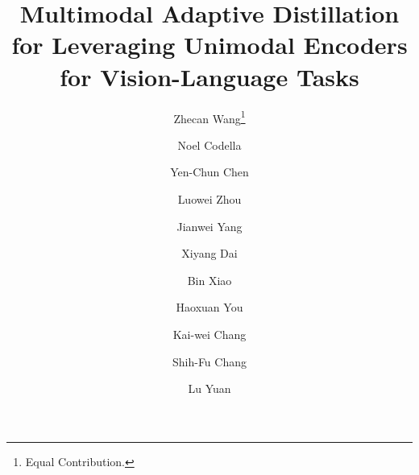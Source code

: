 \documentclass[runningheads]{llncs}
\begin{document}
\pagestyle{headings}
\mainmatter
\def\ECCVSubNumber{6262}  


\title{Multimodal Adaptive Distillation for Leveraging Unimodal Encoders for Vision-Language Tasks}









\author{Zhecan Wang\thanks{Equal Contribution.}
  \and Noel Codella
  \and Yen-Chun Chen
  \and Luowei Zhou
  \and Jianwei Yang
  \and Xiyang Dai
  \and Bin Xiao
  \and Haoxuan You
  \and Kai-wei Chang
  \and Shih-Fu Chang
  \and Lu Yuan}





\maketitle
\end{document}
